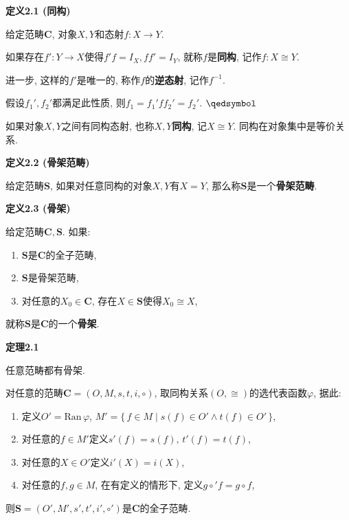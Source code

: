 \documentclass[UTF8]{ctexart}
\begin{document}
\hypertarget{sec:定义2.1}{}
\noindent\textbf{定义2.1 (同构)}

给定范畴$\mathbf{C}$, 对象$X,Y$和态射$f:X\to Y$.

如果存在$f':Y\to X$使得$f'f=I_X,ff'=I_Y$, 就称$f$是\textbf{同构},
记作$f:X\cong Y$.

\vspace{10pt}

进一步, 这样的$f'$是唯一的, 称作$f$的\textbf{逆态射}, 记作$f^{-1}$.


假设$f_1',f_2'$都满足此性质, 则$f_1=f_1'ff_2'=f_2'$. \hfill $\qedsymbol$

\vspace{10pt}

如果对象$X,Y$之间有同构态射, 也称$X,Y$\textbf{同构}, 记$X\cong Y$.
同构在对象集中是等价关系.

\vspace{10pt}

\hypertarget{sec:定义2.2}{}
\noindent\textbf{定义2.2 (骨架范畴)}

给定范畴$\mathbf{S}$, 如果对任意同构的对象$X,Y$有$X=Y$,
那么称$\mathbf{S}$是一个\textbf{骨架范畴}.

\vspace{10pt}

\hypertarget{sec:定义2.3}{}
\noindent\textbf{定义2.3 (骨架)}

给定范畴$\mathbf{C},\mathbf{S}$. 如果:
\begin{enumerate}
    \item $\mathbf{S}$是$\mathbf{C}$的全子范畴,
    \item $\mathbf{S}$是骨架范畴,
    \item 对任意的$X_0\in\mathbf{C}$, 存在$X\in\mathbf{S}$使得$X_0\cong X$,
\end{enumerate}
就称$\mathbf{S}$是$\mathbf{C}$的一个\textbf{骨架}.


\vspace{10pt}

\hypertarget{sec:定理2.1}{}
\noindent\textbf{定理2.1}

任意范畴都有骨架.


对任意的范畴$\mathbf{C}=(O,M,s,t,i,\circ)$,
取同构关系$(O,\cong)$的选代表函数$\varphi$, 据此:
\begin{enumerate}
    \item 定义$O'=\mathrm{Ran}\,\varphi$,
    $M'=\{\,f\in M\mid s(f)\in O'\land t(f)\in O'\,\}$,
    \item 对任意的$f\in M'$定义$s'(f)=s(f),\,t'(f)=t(f)$,
    \item 对任意的$X\in O'$定义$i'(X)=i(X)$,
    \item 对任意的$f,g\in M$, 在有定义的情形下, 定义$g\circ'f=g\circ f$,
\end{enumerate}
则$\mathbf{S}=(O',M',s',t',i',\circ')$是$\mathbf{C}$的全子范畴.
\end{document}
